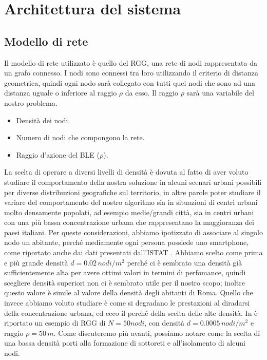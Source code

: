 \chapter{Architettura del sistema}
\label{chap:architettura}

\section{Modello di rete}
\label{sec:modello_rete}
Il modello di rete utilizzato è quello del \acf{RGG}, una rete di nodi rappresentata da un grafo connesso. I nodi sono connessi tra loro utilizzando il criterio di distanza geometrica, quindi ogni nodo sarà collegato con tutti quei nodi che sono ad una distanza uguale o inferiore al raggio $\rho$ da esso. Il raggio $\rho$ sarà una variabile del nostro problema. \medskip

\begin{itemize}
	\item Densità dei nodi.
	\item Numero di nodi che compongono la rete.
	\item Raggio d'azione del \acs{BLE} (\textit{$\rho$}).
\end{itemize}
La scelta di operare a diversi livelli di densità è dovuta al fatto di aver voluto studiare il comportamento della nostra soluzione in alcuni scenari urbani possibili per diverse distribuzioni geografiche sul territorio, in altre parole poter studiare il variare del comportamento del nostro algoritmo sia in situazioni di centri urbani molto densamente popolati, ad esempio medie/grandi città, sia in centri urbani con una più bassa concentrazione urbana che rappresentano la maggioranza dei paesi italiani.
Per queste considerazioni, abbiamo ipotizzato di associare al singolo nodo un abitante, perché mediamente ogni persona possiede uno smartphone, come riportato anche dai dati presentati dall'ISTAT \cite{istat2014}. Abbiamo scelto come prima e più grande densità $ d=0.02\,nodi/m^2$ perché ci è sembrato una densità già sufficientemente alta per avere ottimi valori in termini di perfomance, quindi scegliere densità superiori non ci è sembrato utile per il nostro scopo; inoltre questo valore è simile al valore della densità degli abitanti di Roma. Quello che invece abbiamo voluto studiare è come si degradano le prestazioni al diradarsi della concentrazione urbana, ed ecco il perché della scelta delle alte densità. In  è riportato un esempio di RGG di $ N=50 nodi$, con densità $ d=0.0005\,nodi/m^2$ e raggio $ \rho=50\,m $. Come discuteremo più avanti, possiamo notare come la scelta di una bassa densità porti alla formazione di sottoreti e all'isolamento di alcuni nodi.
\medskip

